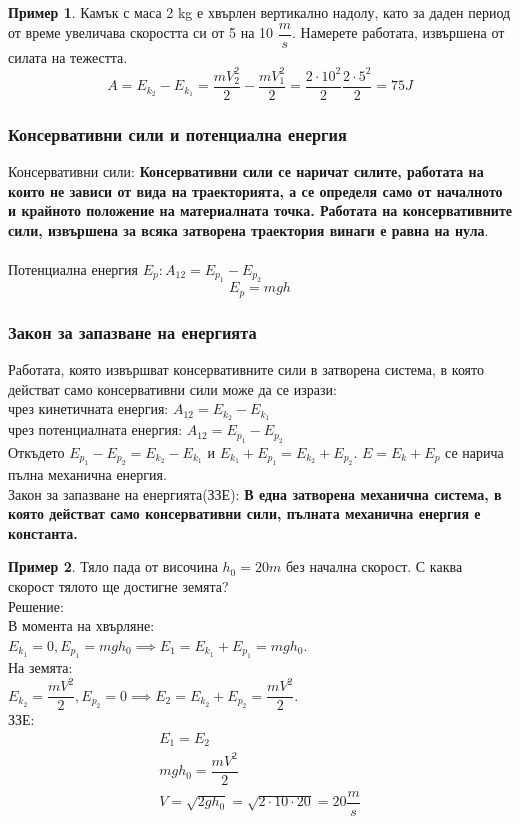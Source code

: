 \documentclass[fleqn, 12pt]{article}
\theoremstyle{definition}
\newtheorem{example}{Пример}[subsection]
\begin{document}
\begin{example}
Камък с маса 2 kg е хвърлен вертикално надолу, като за даден период от време увеличава скоростта си от 5 на 10 $\dfrac{m}{s}$. Намерете работата, извършена от силата на тежестта.
$$A = E_{k_2} - E_{k_1} = \dfrac{mV_2^2}{2} - \dfrac{mV_1^2}{2} = \dfrac{2 \cdot 10^2}{2} \dfrac{2 \cdot 5^2}{2} = 75J$$
\end{example}

\subsubsection{Консервативни сили и потенциална енергия}

Консервативни сили: \textbf{Консервативни сили се наричат силите, работата на които не зависи от вида на траекторията, а се определя само от началното и крайното положение на материалната точка. Работата на консервативните сили, извършена за всяка затворена траектория винаги е равна на нула}. \\
\\
Потенциална енергия $E_p: A_{12} = E_{p_1} - E_{p_2}$
$$E_p = mgh$$

\subsubsection{Закон за запазване на енергията}
Работата, която извършват консервативните сили в затворена система, в която действат само консервативни сили може да се изрази:\\
чрез кинетичната енергия: $A_{12} = E_{k_2} - E_{k_1}$ \\
чрез потенциалната енергия: $A_{12} = E_{p_1} - E_{p_2}$ \\
Откъдето $E_{p_1} - E_{p_2} = E_{k_2} - E_{k_1}$ и $E_{k_1} + E_{p_1} = E_{k_2} + E_{p_2} $. $E = E_k + E_p$ се нарича пълна механична енергия. \\
Закон за запазване на енергията(ЗЗЕ): \textbf{В една затворена механична система, в която действат само консервативни сили, пълната механична енергия е константа.}

\begin{example}
Тяло пада от височина $h_0 = 20m$ без начална скорост. С каква скорост тялото ще достигне земята? \\
Решение:\\
В момента на хвърляне: \\
$E_{k_1} = 0, E_{p_1} = mgh_0 \implies E_1 = E_{k_1} + E_{p_1} = mgh_0$. \\
На земята: \\
$E_{k_2} = \dfrac{mV^2}{2}, E_{p_2} = 0 \implies E_2 = E_{k_2} + E_{p_2} = \dfrac{mV^2}{2}$. \\
ЗЗЕ: 
\begin{gather*}
E_1 = E_2\\
mgh_0 = \dfrac{mV^2}{2}\\
V = \sqrt{2gh_0} = \sqrt{2\cdot 10 \cdot 20} = 20 \dfrac{m}{s}
\end{gather*}
\end{example}
\end{document}
